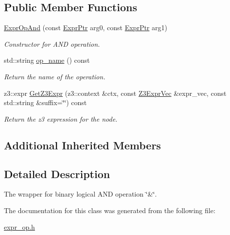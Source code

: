 \subsection*{Public Member Functions}
\begin{DoxyCompactItemize}
\item 
\mbox{\label{classilang_1_1_expr_op_and_a0b217627583e5cda96a09b1f105a4d0b}} 
\mbox{\hyperlink{classilang_1_1_expr_op_and_a0b217627583e5cda96a09b1f105a4d0b}{Expr\+Op\+And}} (const \mbox{\hyperlink{classilang_1_1_expr_a85952b6a34620c4c8cab6bac9c9fdf8c}{Expr\+Ptr}} arg0, const \mbox{\hyperlink{classilang_1_1_expr_a85952b6a34620c4c8cab6bac9c9fdf8c}{Expr\+Ptr}} arg1)
\begin{DoxyCompactList}\small\item\em Constructor for A\+ND operation. \end{DoxyCompactList}\item 
\mbox{\label{classilang_1_1_expr_op_and_a1fb1a53bb5bfde5e53e59637c76dd39d}} 
std\+::string \mbox{\hyperlink{classilang_1_1_expr_op_and_a1fb1a53bb5bfde5e53e59637c76dd39d}{op\+\_\+name}} () const
\begin{DoxyCompactList}\small\item\em Return the name of the operation. \end{DoxyCompactList}\item 
\mbox{\label{classilang_1_1_expr_op_and_ae8f7b9c936a8b04748fd5948c8e8a4ae}} 
z3\+::expr \mbox{\hyperlink{classilang_1_1_expr_op_and_ae8f7b9c936a8b04748fd5948c8e8a4ae}{Get\+Z3\+Expr}} (z3\+::context \&ctx, const \mbox{\hyperlink{namespaceilang_adc4eee919aa24fff882d03a48d733c19}{Z3\+Expr\+Vec}} \&expr\+\_\+vec, const std\+::string \&suffix=\char`\"{}\char`\"{}) const
\begin{DoxyCompactList}\small\item\em Return the z3 expression for the node. \end{DoxyCompactList}\end{DoxyCompactItemize}
\subsection*{Additional Inherited Members}


\subsection{Detailed Description}
The wrapper for binary logical A\+ND operation \char`\"{}\&\char`\"{}. 

The documentation for this class was generated from the following file\+:\begin{DoxyCompactItemize}
\item 
\mbox{\hyperlink{expr__op_8h}{expr\+\_\+op.\+h}}\end{DoxyCompactItemize}
